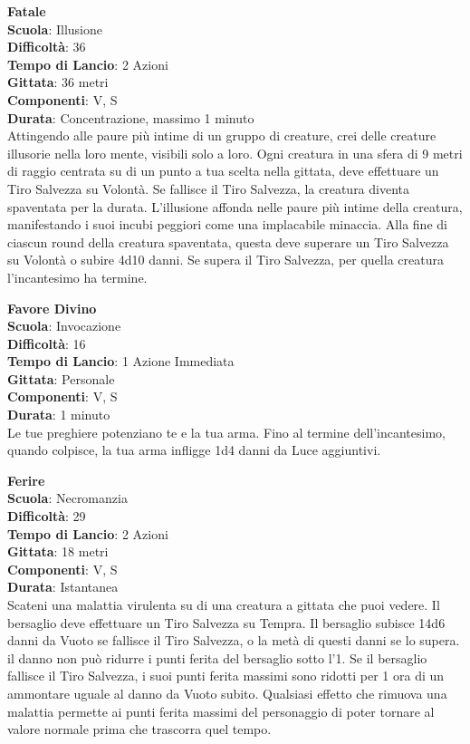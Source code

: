 \begin{multicols}{2}
\medskip\textbf{Fatale}\\
\textbf{Scuola}: Illusione\\
\textbf{Difficoltà}: 36\\
\textbf{Tempo di Lancio}: 2 Azioni\\
\textbf{Gittata}: 36 metri\\
\textbf{Componenti}: V, S\\
\textbf{Durata}: Concentrazione, massimo 1 minuto\\
Attingendo alle paure più intime di un gruppo di creature, crei delle creature illusorie nella loro mente, visibili solo a loro. Ogni creatura in una sfera di 9 metri di raggio centrata su di un punto a tua scelta nella gittata, deve effettuare un Tiro Salvezza su Volontà. Se fallisce il Tiro Salvezza, la creatura diventa spaventata per la durata. L'illusione affonda nelle paure più intime della creatura, manifestando i suoi incubi peggiori come una implacabile minaccia. Alla fine di ciascun round della creatura spaventata, questa deve superare un Tiro Salvezza su Volontà o subire 4d10 danni. Se supera il Tiro Salvezza, per quella creatura l'incantesimo ha termine.

\medskip\textbf{Favore Divino}\\
\textbf{Scuola}: Invocazione\\
\textbf{Difficoltà}: 16\\
\textbf{Tempo di Lancio}: 1 Azione Immediata\\
\textbf{Gittata}: Personale\\
\textbf{Componenti}: V, S\\
\textbf{Durata}: 1 minuto\\
Le tue preghiere potenziano te e la tua arma. Fino al termine dell'incantesimo, quando colpisce, la tua arma infligge 1d4 danni da Luce aggiuntivi.

\medskip\textbf{Ferire}\\
\textbf{Scuola}: Necromanzia\\
\textbf{Difficoltà}: 29\\
\textbf{Tempo di Lancio}: 2 Azioni\\
\textbf{Gittata}: 18 metri\\
\textbf{Componenti}: V, S\\
\textbf{Durata}: Istantanea\\
Scateni una malattia virulenta su di una creatura a gittata che puoi vedere. Il bersaglio deve effettuare un Tiro Salvezza su Tempra. Il bersaglio subisce 14d6 danni da Vuoto se fallisce il Tiro Salvezza, o la metà di questi danni se lo supera. il danno non può ridurre i punti ferita del bersaglio sotto l'1. Se il bersaglio fallisce il Tiro Salvezza, i suoi punti ferita massimi sono ridotti per 1 ora di un ammontare uguale al danno da Vuoto subito. Qualsiasi effetto che rimuova una malattia permette ai punti ferita massimi del personaggio di poter tornare al valore normale prima che trascorra quel tempo.


\end{multicols}
